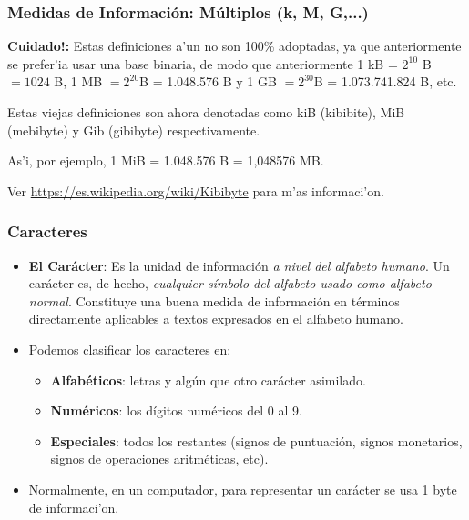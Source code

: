 \documentclass{beamer}
\begin{document}
\begin{frame}[fragile]\frametitle{Medidas de Información: Múltiplos (k, M, G,...)}

\begin{block}{}
\textbf{Cuidado!:} Estas definiciones a'un no son 100\% adoptadas, ya que anteriormente se prefer'ia usar una base binaria, de modo que anteriormente 1 kB = $2^{10}$ B $=1024$ B, 1 MB $=2^{20}$B = 1.048.576 B y 1 GB $=2^{30}$B = 1.073.741.824 B, etc. 
\end{block}

\begin{block}{}
Estas viejas definiciones son ahora denotadas como kiB (kibibite), MiB (mebibyte) y  Gib (gibibyte) respectivamente. 
\end{block}
\begin{block}{}
As'i, por ejemplo, 1 MiB = 1.048.576 B = 1,048576 MB.
\end{block}
Ver \url{https://es.wikipedia.org/wiki/Kibibyte} para m'as informaci'on.
\end{frame}


\begin{frame}[fragile]\frametitle{Caracteres}
\begin{itemize}

\item \textbf{El Carácter}: Es la unidad de información \textit{a nivel del alfabeto humano}. Un carácter es, de hecho, \textit{cualquier símbolo del alfabeto usado como alfabeto normal}. Constituye una buena medida de información en términos directamente aplicables a textos expresados en el alfabeto humano.

\item Podemos clasificar los caracteres en:
	\begin{itemize}
		\item \textbf{Alfabéticos}: letras y algún que otro carácter asimilado.
		\item \textbf{Numéricos}: los dígitos numéricos del 0 al 9.
		\item \textbf{Especiales}: todos los restantes (signos de puntuación, signos monetarios, signos de operaciones aritméticas, etc).
	\end{itemize}
	\item Normalmente, en un computador, para representar un carácter se usa 1 byte de informaci'on.
\end{itemize}
\end{frame}
\end{document}
